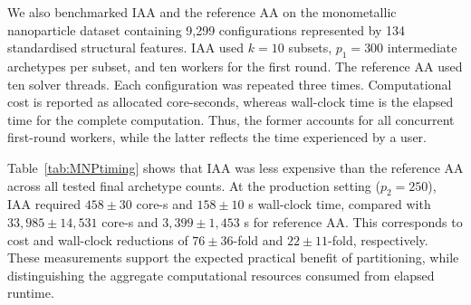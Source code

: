 \documentclass{WileyMSP-template}
\newcommand{\revision}[1]{{\color{red}#1}}
\begin{document}
\revision{We also benchmarked IAA and the reference AA on the monometallic nanoparticle dataset containing 9,299 configurations represented by 134 standardised structural features. IAA used $k=10$ subsets, $p_1=300$ intermediate archetypes per subset, and ten workers for the first round. The reference AA used ten solver threads. Each configuration was repeated three times. Computational cost is reported as allocated core-seconds, whereas wall-clock time is the elapsed time for the complete computation. Thus, the former accounts for all concurrent first-round workers, while the latter reflects the time experienced by a user.

Table~\ref{tab:MNPtiming} shows that IAA was less expensive than the reference AA across all tested final archetype counts. At the production setting ($p_2=250$), IAA required $458 \pm 30$ core-s and $158 \pm 10$ s wall-clock time, compared with $33{,}985 \pm 14{,}531$ core-s and $3{,}399 \pm 1{,}453$ s for reference AA. This corresponds to cost and wall-clock reductions of $76 \pm 36$-fold and $22 \pm 11$-fold, respectively. These measurements support the expected practical benefit of partitioning, while distinguishing the aggregate computational resources consumed from elapsed runtime.}

\begin{table}[t]
\centering
\caption{\revision{Timing benchmark for monometallic dataset ($n=9{,}299$, $m=134$, $k=10$, $p_1=300$). Cost is allocated core-seconds. Wall-clock time corresponds to elapsed runtime. The speedups are computed by dividing the cost for reference archetypal analysis by the cost for iterative archetypal analysis.}}
\label{tab:MNPtiming}
\end{table}
\end{document}
